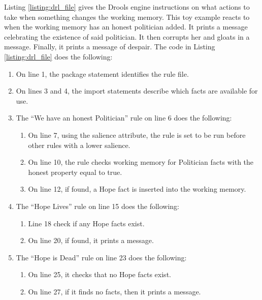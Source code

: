 Listing \ref{listing:drl_file} gives the Drools engine instructions on what actions to take when something changes the working memory.
This toy example reacts to when the working memory has an honest politician added. 
It prints a message celebrating the existence of said politician.
It then corrupts her and gloats in a message.
Finally, it prints a message of despair.
The code in Listing \ref{listing:drl_file} does the following: 
\begin{enumerate}[topsep=2pt,itemsep=2pt,partopsep=2pt, parsep=2pt]
    \setlength\itemsep{0em}
    \item On line 1, the package statement identifies the rule file.
    \item On lines 3 and 4, the import statements describe which facts are available for use.
    \item The ``We have an honest Politician'' rule on line 6 does the following:
    \begin{enumerate}[topsep=2pt,itemsep=2pt,partopsep=2pt, parsep=2pt]
        \setlength\itemsep{0em}
        \item On line 7, using the salience attribute, the rule is set to be run before other rules with a lower salience.
        \item On line 10, the rule checks working memory for Politician facts with the honest property equal to true.
        \item On line 12, if found, a Hope fact is inserted into the working memory.
    \end{enumerate}
    \item The ``Hope Lives'' rule on line 15 does the following:
    \begin{enumerate}[topsep=2pt,itemsep=2pt,partopsep=2pt, parsep=2pt]
        \setlength\itemsep{0em}
        \item Line 18 check if any Hope facts exist.
        \item On line 20, if found, it prints a message.
    \end{enumerate}
    \item The ``Hope is Dead'' rule on line 23 does the following:
    \begin{enumerate}[topsep=2pt,itemsep=2pt,partopsep=2pt, parsep=2pt]
        \setlength\itemsep{0em}
        \item On line 25, it checks that no Hope facts exist.
        \item On line 27, if it finds no facts, then it prints a message.  
    \end{enumerate}

\end{enumerate}
